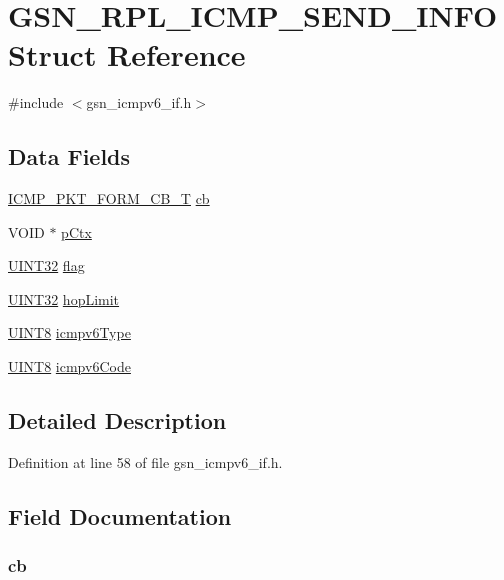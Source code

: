 \hypertarget{a00202}{
\section{GSN\_\-RPL\_\-ICMP\_\-SEND\_\-INFO Struct Reference}
\label{a00202}
}


{\ttfamily \#include $<$gsn\_\-icmpv6\_\-if.h$>$}

\subsection*{Data Fields}
\begin{DoxyCompactItemize}
\item 
\hyperlink{a00517_a78118dbc6ab28e82664a90f2ab3fcc38}{ICMP\_\-PKT\_\-FORM\_\-CB\_\-T} \hyperlink{a00202_af81bb836f1de5956c39eb61d1e085283}{cb}
\item 
VOID $\ast$ \hyperlink{a00202_a5ef049defd7cc5565bb3c81588802ef7}{pCtx}
\item 
\hyperlink{a00660_gae1e6edbbc26d6fbc71a90190d0266018}{UINT32} \hyperlink{a00202_a4da68cacc97065c362b6249ac3890deb}{flag}
\item 
\hyperlink{a00660_gae1e6edbbc26d6fbc71a90190d0266018}{UINT32} \hyperlink{a00202_a8e2cd715a8e99f22a1460c690fa67c3e}{hopLimit}
\item 
\hyperlink{a00660_gab27e9918b538ce9d8ca692479b375b6a}{UINT8} \hyperlink{a00202_a0c56c215ef0c46d3adb96bc1e90e0078}{icmpv6Type}
\item 
\hyperlink{a00660_gab27e9918b538ce9d8ca692479b375b6a}{UINT8} \hyperlink{a00202_a995a5a55b81b8e6e2a21f3ea06bbc150}{icmpv6Code}
\end{DoxyCompactItemize}


\subsection{Detailed Description}


Definition at line 58 of file gsn\_\-icmpv6\_\-if.h.



\subsection{Field Documentation}
\hypertarget{a00202_af81bb836f1de5956c39eb61d1e085283}{
\subsubsection[{cb}]{ {\bf cb}}}
\label{a00202_af81bb836f1de5956c39eb61d1e085283}


